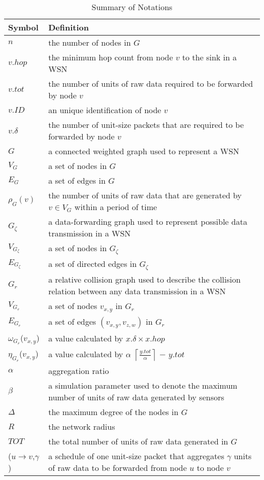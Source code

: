 \begin{table} [!h]
    \centering
    \centering \caption{Summary of Notations}
    \begin{tabular}{|p{1.5cm}|p{6.5cm}|} \hline
    Symbol &Definition
    \\ \hline
    $n$& the number of nodes in $G$
    \\ \hline
    $v.hop$& the minimum hop count from node $v$ to the sink in a WSN
    \\ \hline
    $v.tot$& the number of units of raw data required to be forwarded by node $v$
    \\ \hline
    $v.ID$& an unique identification of node $v$
    \\ \hline
    $v.\delta$& the number of unit-size packets
    that are required to be forwarded by node $v$
    \\ \hline
    $G$& a connected weighted graph used to represent a WSN
    \\ \hline
    $V_G$& a set of nodes in $G$
    \\ \hline
    $E_G$& a set of edges in $G$
    \\ \hline
    $\rho_G(v)$& the number of units of raw data that are generated by
    $v \in V_G$ within a period of time
    \\ \hline
    $G_\zeta$& a data-forwarding graph used to represent possible data transmission in a WSN
    \\ \hline
    $V_{G_\zeta}$& a set of nodes in $G_\zeta$
    \\ \hline
    $E_{G_\zeta}$& a set of directed edges in $G_\zeta$
    \\ \hline
    $G_r$& a relative collision graph used to describe the collision relation between any data transmission in a WSN
    \\ \hline
    $V_{G_r}$& a set of nodes $v_{x,y}$ in $G_r$
    \\ \hline
    $E_{G_r}$& a set of edges $(v_{x,y}, v_{z,w})$ in $G_r$
    \\ \hline
    $\omega_{G_r}$($v_{x,y}$)& a value calculated by $x.\delta \times x.hop$
    \\ \hline
    $\eta_{G_r}$($v_{x,y}$)& a value calculated by $\alpha$ $\left\lceil
    \frac{{y.tot}}{\alpha } \right\rceil$ $-$ $y.tot$
    \\ \hline
    $\alpha$& aggregation ratio
    \\ \hline
    $\beta$& a simulation parameter used to denote the maximum number of units of raw data generated by sensors
    \\ \hline
    $\Delta$& the maximum degree of the nodes in $G$
    \\ \hline
    $R$& the network radius
    \\ \hline
    $TOT$& the total number of units of raw data generated in $G$
    \\ \hline
    ($u \rightarrow v$,$\gamma$)& a schedule of one unit-size packet that aggregates $\gamma$ units of raw data to be forwarded from node $u$ to node $v$
    \\ \hline
    \end{tabular}\label{table:notation}
    
\end{table}